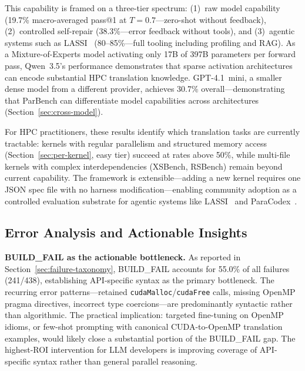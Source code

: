 \documentclass[conference]{IEEEtran}
\newcommand{\buildfail}{\textsc{BUILD\_FAIL}}
\begin{document}
This capability is framed on a three-tier spectrum: (1)~raw model capability (19.7\% macro-averaged pass@1 at $T{=}0.7$---zero-shot without feedback), (2)~controlled self-repair (38.3\%---error feedback without tools), and (3)~agentic systems such as LASSI~\cite{LASSI2024} (80--85\%---full tooling including profiling and RAG). As a Mixture-of-Experts model activating only 17B of 397B parameters per forward pass, Qwen~3.5's performance demonstrates that sparse activation architectures can encode substantial HPC translation knowledge. GPT-4.1~mini, a smaller dense model from a different provider, achieves 30.7\% overall---demonstrating that ParBench can differentiate model capabilities across architectures (Section~\ref{sec:cross-model}). %

For HPC practitioners, these results identify which translation tasks are currently tractable: kernels with regular parallelism and structured memory access (Section~\ref{sec:per-kernel}, easy tier) succeed at rates above 50\%, while multi-file kernels with complex interdependencies (XSBench, RSBench) remain beyond current capability. The framework is extensible---adding a new kernel requires one JSON spec file with no harness modification---enabling community adoption as a controlled evaluation substrate for agentic systems like LASSI~\cite{LASSI2024} and ParaCodex~\cite{ParaCodex2026}.

\subsection{Error Analysis and Actionable Insights}
\label{sec:error-analysis}

\textbf{\buildfail{} as the actionable bottleneck.} As reported in Section~\ref{sec:failure-taxonomy}, \buildfail{} accounts for 55.0\% of all failures (241/438), establishing API-specific syntax as the primary bottleneck. The recurring error patterns---retained \texttt{cudaMalloc}/\texttt{cudaFree} calls, missing OpenMP pragma directives, incorrect type coercions---are predominantly syntactic rather than algorithmic. The practical implication: targeted fine-tuning on OpenMP idioms, or few-shot prompting with canonical CUDA-to-OpenMP translation examples, would likely close a substantial portion of the \buildfail{} gap. The highest-ROI intervention for LLM developers is improving coverage of API-specific syntax rather than general parallel reasoning.
\end{document}
